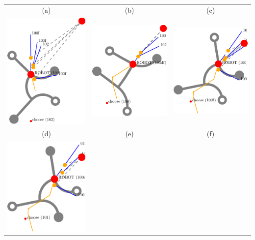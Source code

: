 \documentclass[10pt,a4paper]{article}
\begin{document}
\begin{tabular}{ccc}
\\
(a) & (b) & (c)
\\
\includegraphics[scale=.8]{pics/pathplanner_without_noise/example_curve/dec_3.pdf}
&
\includegraphics[scale=.8]{pics/pathplanner_without_noise/example_curve/dec_9.pdf}
&
\includegraphics[scale=.8]{pics/pathplanner_without_noise/example_curve/dec_10.pdf}
\\
(d) & (e) & (f) 
\\
\includegraphics[scale=.8]{pics/pathplanner_without_noise/example_curve/dec_12.pdf}

\end{tabular}
\end{document}
